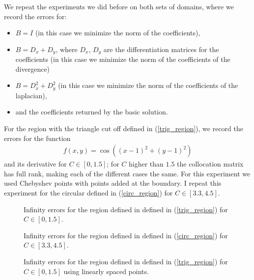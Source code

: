 \documentclass{article}
\begin{document}
We repeat the experiments we did before on both sets of domains, where we record the errors for:
\begin{itemize}
\item $B=I$ (in this case we minimize the norm of the coefficients),
\item $B=D_x+D_y$, where $D_x$, $D_y$ are the differentiation matrices for the coefficients (in this case we minimize the norm of the coefficients of the divergence)
\item $B=D_x^2+D_y^2$ (in this case we minimize the norm of the coefficients of the laplacian),
\item and the coefficients returned by the basic solution. 
\end{itemize}

For the region with the triangle cut off defined in (\ref{trig_region}), we record the errors for the function
\begin{align}
f(x,y) = \cos((x-1)^2+(y-1)^2)
\end{align}
and its derivative for $C \in [0,1.5]$; for $C$ higher than $1.5$ the collocation matrix has full rank, making each of the different cases the same. For this experiment we used Chebyshev points with points added at the boundary. I repeat this experiment for the circular defined in (\ref{circ_region}) for $C \in [3.3 , 4.5]$.

\begin{figure}[!htb]
\centering
{}\hfill
{}
\label{lineplotd}
\caption{Infinity errors for the region defined in  defined in (\ref{trig_region}) for $C \in [0,1.5]$.}
\end{figure}

\begin{figure}[!htb]
\centering
{}\hfill
{}
\label{circplot}
\caption{Infinity errors for the region defined in  defined in (\ref{circ_region}) for $C \in [3.3,4.5]$.}
\end{figure}

\begin{figure}[!htb]
\centering
{}\hfill
{}
\label{lineplotl}
\caption{Infinity errors for the region defined in  defined in (\ref{trig_region}) for $C \in [0,1.5]$ using linearly spaced points.}
\end{figure}
\end{document}
